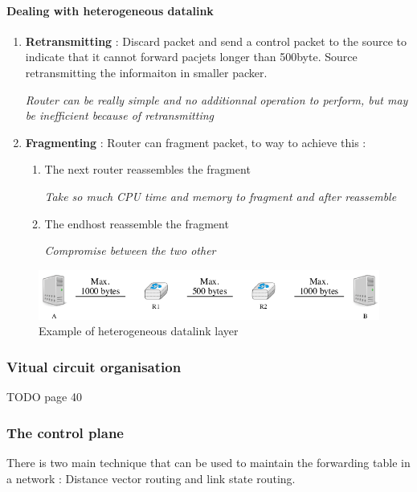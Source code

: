 \paragraph{Dealing with heterogeneous datalink}

\begin{enumerate}
    \item \textbf{Retransmitting} : Discard packet and send a control packet to the source to indicate that it cannot forward pacjets longer than 500byte. Source retransmitting the informaiton in smaller packer.
        \begin{center}
            \textit{Router can be really simple and no additionnal operation to perform,
            but may be inefficient because of retransmitting}
        \end{center}
    \item \textbf{Fragmenting} : Router can fragment packet, to way to achieve this :
        \begin{enumerate}
            \item The next router reassembles the fragment
                \begin{center}
                    \textit{Take so much CPU time and memory to fragment 
                    and after reassemble}
                \end{center}
            \item The endhost reassemble the fragment
                \begin{center}
                    \textit{Compromise between the two other}
                \end{center}
        \end{enumerate}
\end{enumerate}

\begin{figure}[h]
    \centering
    \includegraphics[width=12cm]{heterogeneous.png}
    \caption{Example of heterogeneous datalink layer}
\end{figure}

\subsubsection{Vitual circuit organisation}
TODO page 40

\subsubsection{The control plane}
There is two main technique that can be used to maintain the forwarding table in
a network : Distance vector routing and link state routing.

